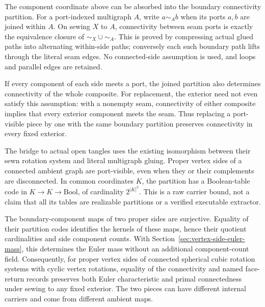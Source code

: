 The component coordinate above can be absorbed into the boundary
connectivity partition. For a port-indexed multigraph $A$, write
$a\sim_A b$ when its ports $a,b$ are joined within $A$. On sewing $X$
to $A$, connectivity between seam ports is exactly the equivalence
closure of ${\sim_X}\cup{\sim_A}$. This is proved by compressing actual
glued paths into alternating within-side paths; conversely each such
boundary path lifts through the literal seam edges. No connected-side
assumption is used, and loops and parallel edges are retained.

If every component of each side meets a port, the joined partition
also determines connectivity of the whole composite. For replacement,
the exterior need not even satisfy this assumption: with a nonempty
seam, connectivity of either composite implies that every exterior
component meets the seam. Thus replacing a port-visible piece by one
with the same boundary partition preserves connectivity in every fixed
exterior.

The bridge to actual open tangles uses the existing isomorphism between
their sewn rotation system and literal multigraph gluing. Proper vertex
sides of a connected ambient graph are port-visible, even when they or
their complements are disconnected. In common coordinates $K$, the
partition has a Boolean-table code in $K\to K\to\mathrm{Bool}$, of
cardinality $2^{|K|^2}$. This is a raw carrier bound, not a claim that
all its tables are realizable partitions or a verified executable
extractor.

The boundary-component maps of two proper sides are surjective. Equality
of their partition codes identifies the kernels of these maps, hence
their quotient cardinalities and side component counts. With
Section~\ref{sec:vertex-side-euler-mass}, this determines the Euler mass
without an additional component-count field. Consequently, for proper
vertex sides of connected spherical cubic rotation systems with cyclic
vertex rotations, equality of the connectivity and named face-return
records preserves both Euler characteristic and primal connectedness
under sewing to any fixed exterior. The two pieces can have different
internal carriers and come from different ambient maps.

